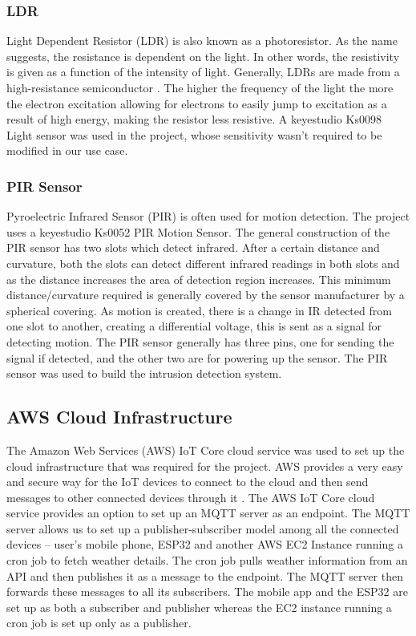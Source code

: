 \documentclass[conference]{IEEEtran}
\begin{document}
\subsubsection{LDR}

Light Dependent Resistor (LDR) is also known as a photoresistor. As the name suggests, the resistance is dependent on the light. In other words, the resistivity is given as a function of the intensity of light. Generally, LDRs are made from a high-resistance semiconductor \cite{ICCCE}. The higher the frequency of the light the more the electron excitation allowing for electrons to easily jump to excitation as a result of high energy, making the resistor less resistive. A keyestudio Ks0098 Light sensor was used in the project, whose sensitivity wasn’t required to be modified in our use case. 

\subsubsection{PIR Sensor}

Pyroelectric Infrared Sensor (PIR) is often used for motion detection. The project uses a keyestudio Ks0052 PIR Motion Sensor. The general construction of the PIR sensor has two slots which detect infrared. After a certain distance and curvature, both the slots can detect different infrared readings in both slots and as the distance increases the area of detection region increases. This minimum distance/curvature required is generally covered by the sensor manufacturer by a spherical covering. As motion is created, there is a change in IR detected from one slot to another, creating a differential voltage, this is sent as a signal for detecting motion. The PIR sensor generally has three pins, one for sending the signal if detected, and the other two are for powering up the sensor. The PIR sensor was used to build the intrusion detection system.

\subsection{AWS Cloud Infrastructure}

The Amazon Web Services (AWS) IoT Core cloud service was used to set up the cloud infrastructure that was required for the project. AWS provides a very easy and secure way for the IoT devices to connect to the cloud and then send messages to other connected devices through it \cite{aws_iot}. The AWS IoT Core cloud service provides an option to set up an MQTT server as an endpoint. The MQTT server allows us to set up a publisher-subscriber model among all the connected devices – user’s mobile phone, ESP32 and another AWS EC2 Instance running a cron job to fetch weather details. The cron job pulls weather information from an API and then publishes it as a message to the endpoint. The MQTT server then forwards these messages to all its subscribers. The mobile app and the ESP32 are set up as both a subscriber and publisher whereas the EC2 instance running a cron job is set up only as a publisher.
\end{document}
